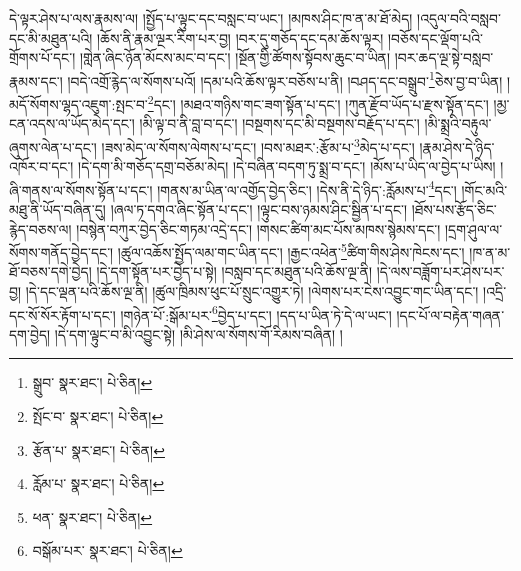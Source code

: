 དེ་ལྟར་ཤེས་པ་ལས་རྣམས་ལ། །སྤྱོད་པ་ལྟུང་དང་བསླང་བ་ཡང་། །མཁས་ཤིང་ཁ་ན་མ་ཐོ་མེད། །འདུལ་བའི་བསླབ་དང་མི་མཐུན་པའི། །ཆོས་ནི་རྣམ་ལྔར་རིག་པར་བྱ། །བར་དུ་གཅོད་དང་དམ་ཆོས་ལྟར། །བཅོས་དང་ལྡོག་པའི་གྲོགས་པོ་དང་། །གླེན་ཞིང་ཉོན་མོངས་མང་བ་དང་། །སྔོན་གྱི་ཚོགས་སྟོབས་ཆུང་བ་ཡིན། །བར་ཆད་ལྔ་སྟེ་བསླབ་རྣམས་དང་། །བདེ་འགྲོ་རྙེད་ལ་སོགས་པའོ། །དམ་པའི་ཆོས་ལྟར་བཅོས་པ་ནི། །བཤད་དང་བསྒྲུབ་\footnote{སྒྲུབ་  སྣར་ཐང་།  པེ་ཅིན། }ཅེས་བྱ་བ་ཡིན། །མདོ་སོགས་ལྷད་འཇུག་:སྤང་བ་\footnote{སྤོང་བ་  སྣར་ཐང་།  པེ་ཅིན། }དང་། །མཐའ་གཉིས་གང་ཟག་སྟོན་པ་དང་། །ཀུན་རྫོབ་ཡོད་པ་རྫས་སྟོན་དང་། །མྱ་ངན་འདས་ལ་ཡོད་མེད་དང་། །མི་ལྟ་བ་ནི་བླ་བ་དང་། །བསྔགས་དང་མི་བསྔགས་བརྗོད་པ་དང་། །མི་སྨྲའི་བརྟུལ་ཞུགས་ལེན་པ་དང་། །ཟས་མེད་ལ་སོགས་ལེགས་པ་དང་། །བས་མཐར་:རྩོམ་པ་\footnote{རྩོན་པ་  སྣར་ཐང་།  པེ་ཅིན། }མེད་པ་དང་། །རྣམ་ཤེས་དེ་ཉིད་འཁོར་བ་དང་། །དེ་དག་མི་གཅོད་དགྲ་བཅོམ་མེད། །དེ་བཞིན་བདག་ཏུ་སྨྲ་བ་དང་། །མོས་པ་ཡིད་ལ་བྱེད་པ་ཡིས། །ཞི་གནས་ལ་སོགས་སྟོན་པ་དང་། །གནས་མ་ཡིན་ལ་འགྱོད་བྱེད་ཅིང་། །དེས་ནི་དེ་ཉིད་:རློམས་པ་\footnote{རློམ་པ་  སྣར་ཐང་།  པེ་ཅིན། }དང་། །གོང་མའི་མཐུ་ནི་ཡོད་བཞིན་དུ། །ཞལ་ཏ་དགའ་ཞིང་སྟོན་པ་དང་། །ལྟུང་བས་ཉམས་ཤིང་སྦྱིན་པ་དང་། །ཐོས་པས་རྩོད་ཅིང་རྙེད་བཅས་ལ། །བསྙེན་བཀུར་བྱེད་ཅིང་གཏམ་འདྲེ་དང་། །གསང་ཚིག་མང་པོས་མཁས་སྙེམས་དང་། །དྲག་ཤུལ་ལ་སོགས་གནོད་བྱེད་དང་། །ཚུལ་འཆོས་སྤྱོད་ལམ་གང་ཡིན་དང་། །རྒྱང་འཕེན་\footnote{ཕན་  སྣར་ཐང་།  པེ་ཅིན། }ཚིག་གིས་ཤེས་ཁེངས་དང་། །ཁ་ན་མ་ཐོ་བཅས་དགེ་བྱེད། །དེ་དག་སྟོན་པར་བྱེད་པ་སྟེ། །བསླབ་དང་མཐུན་པའི་ཆོས་ལྔ་ནི། །དེ་ལས་བཟློག་པར་ཤེས་པར་བྱ། །དེ་དང་ལྡན་པའི་ཆོས་ལྔ་ནི། །ཚུལ་ཁྲིམས་ཕུང་པོ་སྲུང་འགྱུར་ཏེ། །ལེགས་པར་ངེས་འབྱུང་གང་ཡིན་དང་། །འདྲི་དང་སོ་སོར་རྟོག་པ་དང་། །གཉེན་པོ་:སྒོམ་པར་\footnote{བསྒོམ་པར་  སྣར་ཐང་།  པེ་ཅིན། }བྱེད་པ་དང་། །དད་པ་ཡིན་ཏེ་དེ་ལ་ཡང་། །དང་པོ་ལ་བརྟེན་གཞན་དག་བྱེད། །དེ་དག་ལྟུང་བ་མི་འབྱུང་སྟེ། །མི་ཤེས་ལ་སོགས་གོ་རིམས་བཞིན། །
